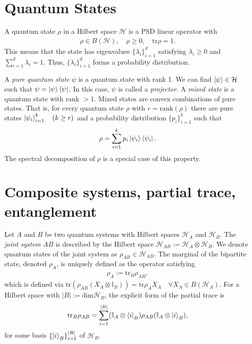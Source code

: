 \documentclass[10pt,oneside,longbibliography]{report}
\begin{document}
\section{Quantum States}
A quantum state $\rho$ in a Hilbert space $\mathcal{H}$ is a PSD linear operator with
\begin{align}
    \rho \in B(\mathcal{H}), \quad \rho \geq 0, \quad \text{tr}\rho =1.
\end{align}
This means that the state has eigenvalues $\{\lambda_i\}_{i=1}^d$ satisfying $\lambda_i\geq 0$ and $\sum_{i=1}^d \lambda_i =1$. Thus, $\{\lambda_i\}_{i=1}^d$ forms a probability distribution. 

A \textit{pure quantum state} $\psi$ is a quantum state with rank 1. We can find $\ket{\psi}\in \mathcal{H}$ such that $\psi =\ket{\psi}\bra{\psi}$. In this case, $\psi$ is called a \textit{projector}. A \textit{mixed state} is a quantum state with rank $>1$. Mixed states are convex combinations of pure states. That is, for every quantum state $\rho$ with $r=\text{rank}(\rho)$ there are pure states $\ket{\psi_i}_{i=1}^k \quad (k\geq r)$ and a probability distribution $\{p_i\}_{i=1}^k$ such that 
\begin{align}
    \rho=\sum_{i=1}^k p_i \ket{\psi_i}\bra{\psi_i}.
\end{align}
The spectral decomposition of $\rho$ is a special case of this property. 
\section{Composite systems, partial trace, entanglement}
Let $A$ and $B$ be two quantum systems with Hilbert spaces $\mathcal{H}_A$ and $\mathcal{H}_B$. The \textit{joint system} $AB$ is described by the Hilbert space $\mathcal{H}_{AB}:=\mathcal{H}_A \otimes \mathcal{H}_B$. We denote quantum states of the joint system as $\rho_{AB}\in \mathcal{H}_{AB}$. The marginal of the bipartite state, denoted $\rho_A$, is uniquely defined as the operator satisfying
\begin{align}
    \rho_{A}:=\text{tr}_B\rho_{AB}, 
\end{align}
which is defined via $\text{tr}(\rho_{AB}(X_{A}\otimes \mathbb{I}_B))=\text{tr}\rho_A X_A \quad \forall X_A \in B(\mathcal{H}_A)$. For a Hilbert space with $|B|:=\text{dim}\mathcal{H}_B$, the explicit form of the partial trace is
\begin{align}
    \text{tr}_B \rho_{AB}=\sum_{i=1}^{|B|}(\mathbb{I}_A \otimes \bra{i}_B)\rho_{AB} (\mathbb{I}_A\otimes \ket{i}_B),
\end{align}
for some basis $\{\ket{i}_B\}_{i=1}^{|B|}$ of $\mathcal{H}_B$. 
\end{document}
